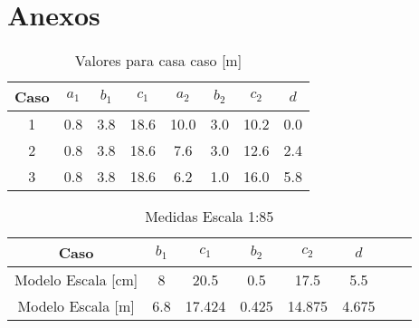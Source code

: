 \section*{Anexos}

\begin{table}[H]
    \centering
    \begin{tabular}{|c|c|c|c|c|c|c|c|}
    \hline
    Caso & $a_1$ & $b_1$ & $c_1$ & $a_2$ & $b_2$ & $c_2$ & $d$ \\ \hline
    1    & 0.8   & 3.8   & 18.6  & 10.0  & 3.0   & 10.2  & 0.0 \\ \hline
    2    & 0.8   & 3.8   & 18.6  & 7.6   & 3.0   & 12.6  & 2.4  \\ \hline
    3    & 0.8   & 3.8   & 18.6  & 6.2   & 1.0   & 16.0  & 5.8  \\ \hline
    \end{tabular}
    \caption{Valores para casa caso [m]}
    \label{tab:medidas}
\end{table}

\begin{table}[H]
    \centering
    \begin{tabular}{|c|c|c|c|c|c|c|c|}
    \hline
    Caso  & $b_1$ & $c_1$  & $b_2$ & $c_2$ & $d$ \\ \hline
    Modelo Escala [cm] & 8  & 20.5  & 0.5   & 17.5  & 5.5 \\ \hline
    Modelo Escala [m] & 6.8  & 17.424 & 0.425   & 14.875  & 4.675  \\ \hline
    \end{tabular}
    \caption{Medidas Escala 1:85}
    \label{tab:medidas_escaladas}
\end{table}
    
